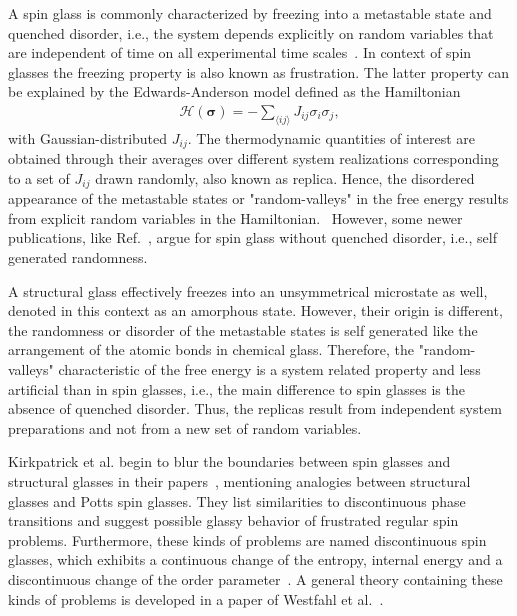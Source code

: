 A spin glass is commonly characterized by freezing into a metastable state and quenched disorder, i.e., the system depends 
explicitly on random variables that are independent of time on all experimental
time scales~\cite{Binder1986}. In context of spin glasses the freezing property is also known as
frustration. The latter property can be explained by the Edwards-Anderson model defined as the Hamiltonian
\begin{align*}
    \mathcal{H}(\bm{\sigma})=-\sum_{\langle ij \rangle}J_{ij}\sigma_i\sigma_j,
\end{align*}
with Gaussian-distributed $J_{ij}$. The thermodynamic quantities of interest are obtained through their averages over different system realizations 
corresponding to a set of $J_{ij}$ drawn randomly, also known as replica. Hence, the disordered appearance of the metastable states or "random-valleys"
in the free energy results from explicit random variables in the Hamiltonian.~\cite{Binder1986} However, some newer publications, like 
Ref.~\cite{Westfahl2001,Kamber2020}, argue for spin glass without quenched disorder, i.e., self generated randomness.



A structural glass effectively freezes into an unsymmetrical microstate as well, denoted in this context as an amorphous state. However, their origin is 
different, the randomness or disorder of the metastable states is self generated like the arrangement of the atomic bonds in chemical glass. Therefore, the 
"random-valleys" characteristic of the free energy is a system related property and less artificial than in spin glasses, i.e., the main difference
to spin glasses is the absence of quenched disorder. Thus, the replicas result from independent system preparations and not from a new set of random 
variables.~\cite{Mezard2000}

Kirkpatrick et al. begin to blur the boundaries between spin glasses and structural glasses in their papers~\cite{Kirkpatrick1986,Kirkpatrick1987},
mentioning analogies between structural glasses and Potts spin glasses. They list similarities to discontinuous phase transitions and 
suggest possible glassy behavior of frustrated regular spin problems. Furthermore, these kinds of
problems are named discontinuous spin glasses, which exhibits a continuous change of the entropy, internal energy and a discontinuous
change of the order parameter~\cite{Mezard2000}. A general theory containing these kinds of problems is developed in a paper of Westfahl et al.~\cite{Westfahl2001}. 

